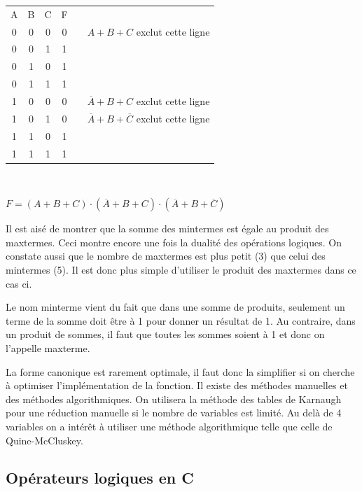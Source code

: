 \begin{center}
\begin{tabular}{*{3}{|c} ||c| p{1cm} p{5cm}}
A & B & C & F\\
0 & 0 & 0 & 0 & & $A +B + C$ exclut cette ligne\\
0 & 0 & 1 & 1\\
0 & 1 & 0 & 1\\
0 & 1 & 1 & 1\\
1 & 0 & 0 & 0 & & $\overline{A} + B + C$ exclut cette ligne\\
1 & 0 & 1 & 0 & & $\overline{A} + B + \overline{C}$ exclut cette ligne\\
1 & 1 & 0 & 1\\
1 & 1 & 1 & 1\\
\end{tabular}\\
\end{center}

\begin{center}
$F = (A +B + C) \cdot (\overline{A} + B + C) \cdot (\overline{A} + B + \overline{C})$
\end{center}

Il est aisé de montrer que la somme des mintermes est égale au produit des maxtermes. Ceci montre encore une fois la dualité des opérations logiques. On constate aussi que le nombre de maxtermes est plus petit (3) que celui des mintermes (5). Il est donc plus simple d'utiliser le produit des maxtermes dans ce cas ci.

Le nom minterme vient du fait que dans une somme de produits, seulement un terme de la somme doit être à 1 pour donner un résultat de 1. Au contraire, dans un produit de sommes, il faut que toutes les sommes soient à 1 et donc on l'appelle maxterme.

La forme canonique est rarement optimale, il faut donc la simplifier si on cherche à optimiser l'implémentation de la fonction. Il existe des méthodes manuelles et des méthodes algorithmiques. On utilisera la méthode des tables de Karnaugh pour une réduction manuelle si le nombre de variables est limité. Au delà de 4 variables on a intérêt à utiliser une méthode algorithmique telle que celle de Quine-McCluskey.

\subsection{Opérateurs logiques en C}

